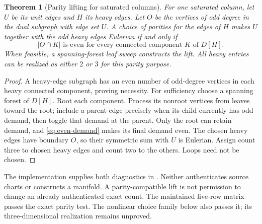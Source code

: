\documentclass[11pt,letterpaper]{article}
\newtheorem{theorem}{Theorem}[section]
\theoremstyle{definition}
\begin{document}
\begin{theorem}[Parity lifting for saturated columns]\label{thm:parity-lift}
For one saturated column, let $U$ be its unit edges and $H$ its heavy edges.
Let $O$ be the vertices of odd degree in the dual subgraph with edge set
$U$. A choice of parities for the edges of $H$ makes $U$ together with the
odd heavy edges Eulerian if and only if
\begin{equation}\label{eq:even-demand}
 |O\cap K|\text{ is even for every connected component }K\text{ of }D[H].
\end{equation}
When feasible, a spanning-forest leaf sweep constructs the lift. All heavy
entries can be realized as either $2$ or $3$ for this parity purpose.
\end{theorem}
\begin{proof}
A heavy-edge subgraph has an even number of odd-degree vertices in each
heavy connected component, proving necessity. For sufficiency choose a
spanning forest of $D[H]$. Root each component. Process its nonroot vertices
from leaves toward the root; include a parent edge precisely when its child
currently has odd demand, then toggle that demand at the parent. Only the
root can retain demand, and \eqref{eq:even-demand} makes its final demand
even. The chosen heavy edges have boundary $O$, so their symmetric sum with
$U$ is Eulerian. Assign count three to chosen heavy edges and count two to
the others. Loops need not be chosen.
\end{proof}
The implementation supplies both diagnostics in
. Neither authenticates source charts or
constructs a manifold. A parity-compatible lift is not permission to change
an already authenticated exact count. The maintained five-row matrix passes
the exact parity test. The nonlinear choice family below also passes it;
its three-dimensional realization remains unproved.
\end{document}
